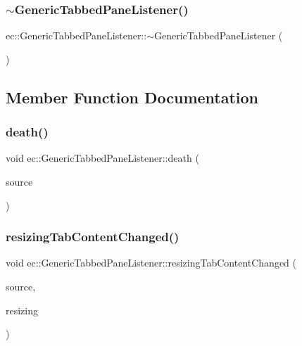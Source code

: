 \subsubsection{\texorpdfstring{$\sim$\+Generic\+Tabbed\+Pane\+Listener()}{~GenericTabbedPaneListener()}}
{\footnotesize\ttfamily ec\+::\+Generic\+Tabbed\+Pane\+Listener\+::$\sim$\+Generic\+Tabbed\+Pane\+Listener (\begin{DoxyParamCaption}{ }\end{DoxyParamCaption})\hspace{0.3cm}{\ttfamily [default]}}



\subsection{Member Function Documentation}
\mbox{\label{classec_1_1_generic_tabbed_pane_listener_aee95a52820d4f194c9bf726301f63240}} 
\subsubsection{\texorpdfstring{death()}{death()}}
{\footnotesize\ttfamily void ec\+::\+Generic\+Tabbed\+Pane\+Listener\+::death (\begin{DoxyParamCaption}\item[{agui\+::\+Tabbed\+Pane $\ast$}]{source }\end{DoxyParamCaption})\hspace{0.3cm}{\ttfamily [override]}}

\mbox{\label{classec_1_1_generic_tabbed_pane_listener_aa75a279b781f32aeaf5adf8249a2aa0f}} 
\subsubsection{\texorpdfstring{resizing\+Tab\+Content\+Changed()}{resizingTabContentChanged()}}
{\footnotesize\ttfamily void ec\+::\+Generic\+Tabbed\+Pane\+Listener\+::resizing\+Tab\+Content\+Changed (\begin{DoxyParamCaption}\item[{agui\+::\+Tabbed\+Pane $\ast$}]{source,  }\item[{bool}]{resizing }\end{DoxyParamCaption})\hspace{0.3cm}{\ttfamily [override]}}

